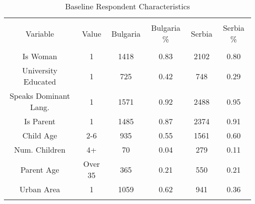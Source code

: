 
\begin{table}[!htbp] \centering 
  \caption{Baseline Respondent Characteristics} 
  \label{tbl:Baseline Respondent Characteristics} 
\begin{tabular}{@{\extracolsep{5pt}} cccccc} 
\\[-1.8ex]\hline 
\hline \\[-1.8ex] 
Variable & Value & Bulgaria & Bulgaria \% & Serbia & Serbia \% \\ 
\hline \\[-1.8ex] 
Is Woman & 1 & 1418 & 0.83 & 2102 & 0.80 \\ 
University Educated & 1 &  725 & 0.42 &  748 & 0.29 \\ 
Speaks Dominant Lang. & 1 & 1571 & 0.92 & 2488 & 0.95 \\ 
Is Parent & 1 & 1485 & 0.87 & 2374 & 0.91 \\ 
Child Age & 2-6 &  935 & 0.55 & 1561 & 0.60 \\ 
Num. Children & 4+ &   70 & 0.04 &  279 & 0.11 \\ 
Parent Age & Over 35 &  365 & 0.21 &  550 & 0.21 \\ 
Urban Area & 1 & 1059 & 0.62 &  941 & 0.36 \\ 
\hline \\[-1.8ex] 
\end{tabular} 
\end{table} 
